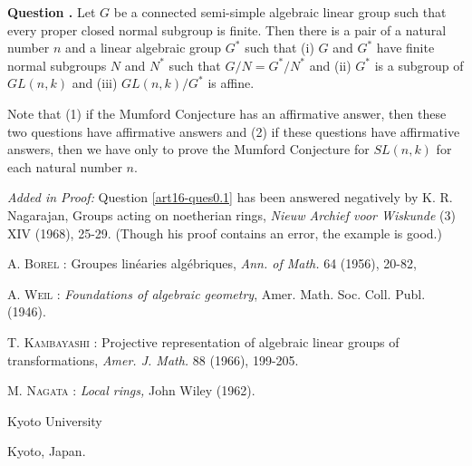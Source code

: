\medskip
\noindent
{\bf Question .\label{art16-ques5.5}}
Let $G$ be a connected semi-simple algebraic linear group such that every proper closed normal subgroup is finite. Then there is a pair of a natural number $n$ and a linear algebraic group $G^{*}$ such that (i) $G$ and $G^{*}$ have finite normal subgroups $N$ and $N^{*}$ such that $G/N=G^{*}/N^{*}$ and (ii) $G^{*}$ is a subgroup of $GL(n,k)$ and (iii) $GL(n,k)/G^{*}$ is affine.
\smallskip

Note that (1) if the Mumford Conjecture has an affirmative answer, then these two questions have affirmative answers and (2) if these questions have affirmative answers, then we have only to prove the Mumford Conjecture for $SL(n,k)$ for each natural number $n$.

{\em Added in Proof:} Question \ref{art16-ques0.1} has been answered negatively by K. R. Nagarajan, Groups acting on noetherian rings, {\em Nieuw Archief voor Wiskunde} (3) XIV (1968), 25-29. (Though his proof contains an error, the example is good.)

\begin{thebibliography}{99}
 \textsc{A. Borel :} Groupes lin\'earies alg\'ebriques, {\em Ann. of Math.} 64 (1956), 20-82,

 \textsc{A. Weil :} {\em Foundations of algebraic geometry}, Amer. Math. Soc. Coll. Publ. (1946).

 \textsc{T. Kambayashi :} Projective representation of algebraic linear groups of transformations, {\em Amer. J. Math.} 88 (1966), 199-205.

 \textsc{M. Nagata :} {\em Local rings,} John Wiley (1962).
\end{thebibliography}

\bigskip

\noindent
{\small Kyoto University}

\noindent
{\small Kyoto, Japan.}



